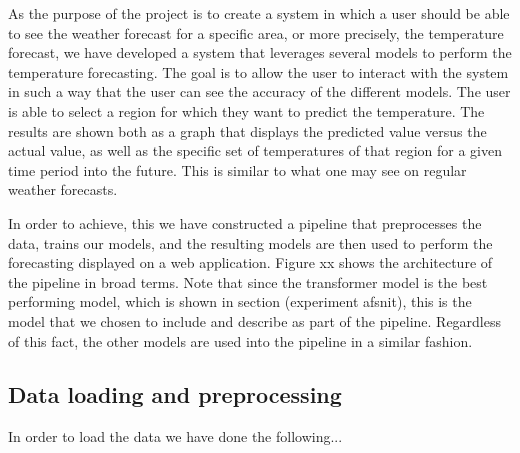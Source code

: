 As the purpose of the project is to create a system in which a user should be able to see the weather forecast for a specific area, or more precisely, the temperature forecast, we have developed a system that leverages several models to perform the temperature forecasting. 
The goal is to allow the user to interact with the system in such a way that the user can see the accuracy of the different models. 
The user is able to select a region for which they want to predict the temperature. The results are shown both as a graph that displays the predicted value versus the actual value, as well as the specific set of temperatures of that region for a given time period into the future. This is similar to what one may see on regular weather forecasts.

In order to achieve, this we have constructed a pipeline that preprocesses the data, trains our models, and the resulting models are then used to perform the forecasting displayed on a web application. 
Figure xx shows the architecture of the pipeline in broad terms. 
Note that since the transformer model is the best performing model, which is shown in section (experiment afsnit), this is the model that we chosen to include and describe as part of the pipeline. Regardless of this fact, the other models are used into the pipeline in a similar fashion.

\subsection{Data loading and preprocessing}
In order to load the data we have done the following...